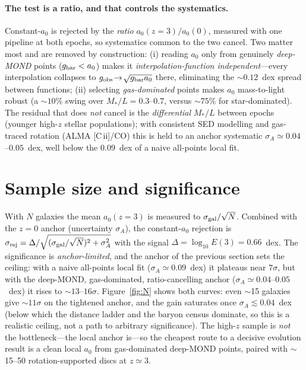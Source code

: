 \documentclass[11pt]{article}
\newcommand{\az}{a_0}
\begin{document}
\paragraph{The test is a ratio, and that controls the systematics.} Constant-$\az$ is rejected by the
\emph{ratio} $\az(z{=}3)/\az(0)$, measured with one pipeline at both epochs, so systematics common to
the two cancel. Two matter most and are removed by construction: (i) reading $\az$ only from genuinely
\emph{deep-MOND} points ($g_{\rm bar}<\az$) makes it \emph{interpolation-function independent}---every
interpolation collapses to $g_{\rm obs}\!\to\!\sqrt{g_{\rm bar}\az}$ there, eliminating the
$\sim0.12$~dex spread between functions; (ii) selecting \emph{gas-dominated} points makes $\az$
mass-to-light robust (a $\sim10\%$ swing over $M_*/L=0.3$--$0.7$, versus $\sim75\%$ for
star-dominated). The residual that does \emph{not} cancel is the \emph{differential} $M_*/L$ between
epochs (younger high-$z$ stellar populations); with consistent SED modelling and gas-traced rotation
(ALMA [C\,{\sc ii}]/CO) this is held to an anchor systematic $\sigma_A\simeq0.04$--$0.05$~dex, well
below the $0.09$~dex of a naive all-points local fit.

\section{Sample size and significance}
With $N$ galaxies the mean $\az(z{=}3)$ is measured to $\sigma_{\rm gal}/\sqrt{N}$. Combined with the
$z=0$ anchor (uncertainty $\sigma_A$), the constant-$\az$ rejection is
$\sigma_{\rm rej}=\Delta/\sqrt{(\sigma_{\rm gal}/\sqrt N)^2+\sigma_A^2}$ with the signal
$\Delta=\log_{10}E(3)=0.66$~dex. The significance is \emph{anchor-limited}, and the anchor of the
previous section sets the ceiling: with a naive all-points local fit ($\sigma_A\simeq0.09$~dex) it
plateaus near $7\sigma$, but with the deep-MOND, gas-dominated, ratio-cancelling anchor
($\sigma_A\simeq0.04$--$0.05$~dex) it rises to $\sim13$--$16\sigma$. Figure~\ref{fig:N} shows both
curves: even $\sim$15 galaxies give $\sim11\sigma$ on the tightened anchor, and the gain saturates once
$\sigma_A\lesssim0.04$~dex (below which the distance ladder and the baryon census dominate, so this is
a realistic ceiling, not a path to arbitrary significance). The high-$z$ sample is \emph{not} the
bottleneck---the local anchor is---so the cheapest route to a decisive evolution result is a clean
local $\az$ from gas-dominated deep-MOND points, paired with $\sim$15--50 rotation-supported discs at
$z\simeq3$.
\end{document}
